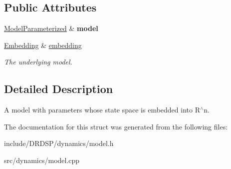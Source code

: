\subsection*{Public Attributes}
\begin{DoxyCompactItemize}
\item 
\hypertarget{struct_d_r_d_s_p_1_1_model_parameterized_embedded_ad28b3f0f264467c90fdf0577247b78c9}{\hyperlink{struct_d_r_d_s_p_1_1_model_parameterized}{Model\-Parameterized} \& {\bfseries model}}\label{struct_d_r_d_s_p_1_1_model_parameterized_embedded_ad28b3f0f264467c90fdf0577247b78c9}

\item 
\hypertarget{struct_d_r_d_s_p_1_1_model_parameterized_embedded_acb6dafec5e47012779a1b7fcbee6227d}{\hyperlink{struct_d_r_d_s_p_1_1_embedding}{Embedding} \& \hyperlink{struct_d_r_d_s_p_1_1_model_parameterized_embedded_acb6dafec5e47012779a1b7fcbee6227d}{embedding}}\label{struct_d_r_d_s_p_1_1_model_parameterized_embedded_acb6dafec5e47012779a1b7fcbee6227d}

\begin{DoxyCompactList}\small\item\em The underlying model. \end{DoxyCompactList}\end{DoxyCompactItemize}


\subsection{Detailed Description}
A model with parameters whose state space is embedded into R$^\wedge$n. 

The documentation for this struct was generated from the following files\-:\begin{DoxyCompactItemize}
\item 
include/\-D\-R\-D\-S\-P/dynamics/model.\-h\item 
src/dynamics/model.\-cpp\end{DoxyCompactItemize}
